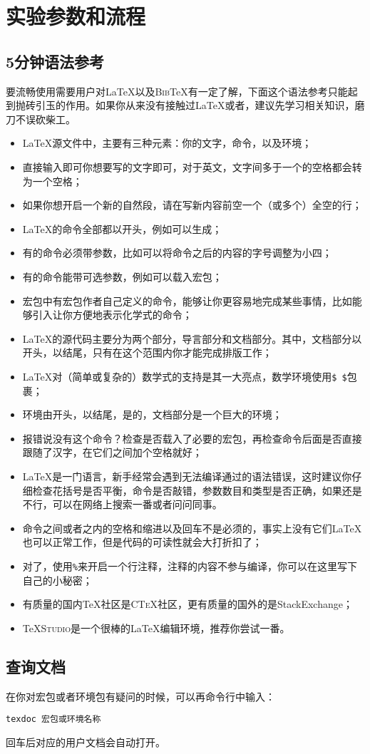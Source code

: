 \chapter{实验参数和流程}
\section{5分钟语法参考}

{\kaishu 要流畅使用\cquthesis 需要用户对\LaTeX 以及\textsc{Bib}\TeX 有一定了解，下面这个语法参考只能起到抛砖引玉的作用。如果你从来没有接触过\LaTeX 或者\XeTeX ，建议先学习相关知识，磨刀不误砍柴工。}
\medskip
\begin{itemize}
	\item \LaTeX 源文件中，主要有三种元素：你的文字，命令，以及环境；
	\item 直接输入即可你想要写的文字即可，对于英文，文字间多于一个的空格都会转为一个空格；
	\item 如果你想开启一个新的自然段，请在写新内容前空一个（或多个）全空的行；
	\item \LaTeX 的命令{\heiti 全部}都以\cs{ }开头，例如可以生成\XeTeX ；
	\item 有的命令{\heiti 必须}带参数，比如可以将命令之后的内容的字号调整为小四；
	\item 有的命令能带可选参数，例如可以载入宏包；
	\item 宏包中有宏包作者自己定义的命令，能够让你更容易地完成某些事情，比如能够引入让你方便地表示化学式的命令；
	\item \LaTeX 的源代码主要分为两个部分，导言部分和文档部分。其中，文档部分以开头，以结尾，只有在这个范围内你才能完成排版工作；
	\item \LaTeX 对（简单或复杂的）数学式的支持是其一大亮点，数学环境使用\texttt{\${ }\$}包裹；
	\item 环境由开头，以结尾，是的，文档部分是一个巨大的环境；
	\item 报错说没有这个命令？检查是否载入了必要的宏包，再检查命令后面是否直接跟随了汉字，在它们之间加个空格就好；
	\item \LaTeX 是一门语言，新手经常会遇到无法编译通过的语法错误，这时建议你仔细检查花括号是否平衡，命令是否敲错，参数数目和类型是否正确，如果还是不行，可以在网络上搜索一番或者问问同事。
	\item 命令之间或者之内的空格和缩进以及回车不是必须的，事实上没有它们\LaTeX 也可以正常工作，但是代码的可读性就会大打折扣了；
	\item 对了，使用\texttt{\%}来开启一个行注释，注释的内容不参与编译，你可以在这里写下自己的小秘密；
	\item 有质量的国内\TeX 社区是\textsc{CTeX}社区，更有质量的国外的是\textsf{StackExchange}；
	\item \TeX\textsc{Studio}是一个很棒的\LaTeX 编辑环境，推荐你尝试一番。
\end{itemize}

\section{查询文档}
在你对宏包或者环境包有疑问的时候，可以再命令行中输入：

\texttt{texdoc 宏包或环境名称}

回车后对应的用户文档会自动打开。





